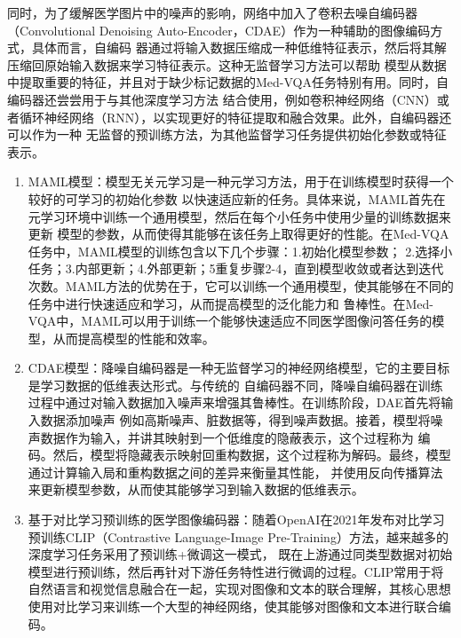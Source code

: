 同时，为了缓解医学图片中的噪声的影响，网络中加入了卷积去噪自编码器（Convolutional Denoising Auto-Encoder，CDAE）\cite{masci2011stacked}作为一种辅助的图像编码方式，具体而言，自编码
器通过将输入数据压缩成一种低维特征表示，然后将其解压缩回原始输入数据来学习特征表示。这种无监督学习方法可以帮助
模型从数据中提取重要的特征，并且对于缺少标记数据的Med-VQA任务特别有用。同时，自编码器还尝尝用于与其他深度学习方法
结合使用，例如卷积神经网络（CNN）或者循环神经网络（RNN），以实现更好的特征提取和融合效果。此外，自编码器还可以作为一种
无监督的预训练方法，为其他监督学习任务提供初始化参数或特征表示。
% 
\begin{enumerate}[topsep = 0 pt, itemsep= 0 pt, parsep=0pt, partopsep=0pt, leftmargin=44pt, itemindent=0pt, labelsep=6pt, label=(\arabic*)]
	\item MAML模型：模型无关元学习是一种元学习方法，用于在训练模型时获得一个较好的可学习的初始化参数
	以快速适应新的任务。具体来说，MAML首先在元学习环境中训练一个通用模型，然后在每个小任务中使用少量的训练数据来更新
	模型的参数，从而使得其能够在该任务上取得更好的性能。在Med-VQA任务中，MAML模型的训练包含以下几个步骤：1.初始化模型参数；
	2.选择小任务；3.内部更新；4.外部更新；5重复步骤2-4，直到模型收敛或者达到迭代次数。MAML方法的优势在于，它可以训练一个通用模型，使其能够在不同的任务中进行快速适应和学习，从而提高模型的泛化能力和
	鲁棒性。在Med-VQA中，MAML可以用于训练一个能够快速适应不同医学图像问答任务的模型，从而提高模型的性能和效率。
	\item CDAE模型：降噪自编码器是一种无监督学习的神经网络模型，它的主要目标是学习数据的低维表达形式。与传统的
	自编码器不同，降噪自编码器在训练过程中通过对输入数据加入噪声来增强其鲁棒性。在训练阶段，DAE首先将输入数据添加噪声
	例如高斯噪声、脏数据等，得到噪声数据。接着，模型将噪声数据作为输入，并讲其映射到一个低维度的隐蔽表示，这个过程称为
	编码。然后，模型将隐藏表示映射回重构数据，这个过程称为解码。最终，模型通过计算输入局和重构数据之间的差异来衡量其性能，
	并使用反向传播算法来更新模型参数，从而使其能够学习到输入数据的低维表示。
	\item 基于对比学习预训练的医学图像编码器：随着OpenAI在2021年发布对比学习预训练CLIP\cite{radford2021learning}（Contrastive Language-Image Pre-Training）方法，越来越多的深度学习任务采用了预训练+微调这一模式，
	既在上游通过同类型数据对初始模型进行预训练，然后再针对下游任务特性进行微调的过程。CLIP常用于将自然语言和视觉信息融合在一起，实现对图像和文本的联合理解，其核心思想使用对比学习来训练一个大型的神经网络，使其能够对图像和文本进行联合编码。
\end{enumerate}

